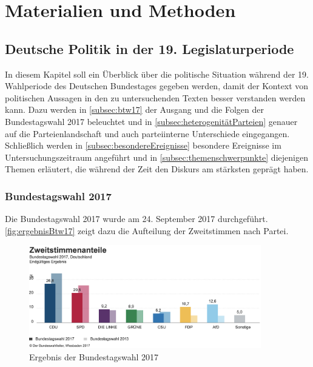 
\chapter{Materialien und Methoden} \label{ch:materialsAndMethods}



\section{Deutsche Politik in der 19. Legislaturperiode}

In diesem Kapitel soll ein Überblick über die politische Situation während der \num{19}. Wahlperiode des Deutschen Bundestages gegeben werden, damit der Kontext von politischen Aussagen in den zu untersuchenden Texten besser verstanden werden kann. Dazu werden in \autoref{subsec:btw17} der Ausgang und die Folgen der Bundestagswahl \num{2017} beleuchtet und in \autoref{subsec:heterogenitätParteien} genauer auf die Parteienlandschaft und auch parteiinterne Unterschiede eingegangen. Schließlich werden in \autoref{subsec:besondereEreignisse} besondere Ereignisse im Untersuchungszeitraum angeführt und in \autoref{subsec:themenschwerpunkte} diejenigen Themen erläutert, die während der Zeit den Diskurs am stärksten geprägt haben.

\subsection{Bundestagswahl \num{2017}} \label{subsec:btw17}

Die Bundestagswahl \num{2017} wurde am \num{24}. September \num{2017} durchgeführt. \autoref{fig:ergebnisBtw17} zeigt dazu die Aufteilung der Zweitstimmen nach Partei.

\begin{figure}[H]
    \centering
    \includegraphics[width=0.9\textwidth]{data/images/ergebnisBtw17.png}
    \caption{Ergebnis der Bundestagswahl \num{2017} \autocite{noauthor_bundestagswahl_nodate}} \label{fig:ergebnisBtw17}
\end{figure}

